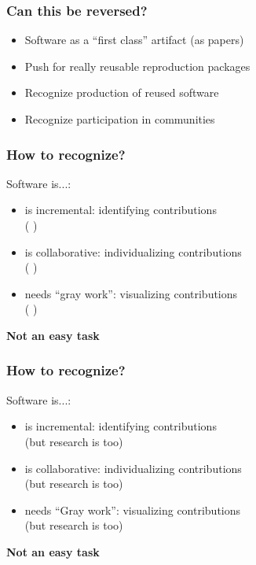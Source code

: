 \documentclass[17pt,aspectratio=169,hyperref={pdfusetitle,colorlinks,allcolors=olive}]{beamer}
\begin{document}
\begin{frame}[fragile]
  \frametitle{Can this be reversed?}
  
  \begin{itemize}
  \item Software as a ``first class'' artifact (as papers)
  \item Push for really reusable reproduction packages
  \item Recognize production of reused software
  \item Recognize participation in communities
  \end{itemize}

\end{frame}

\begin{frame}[fragile]
  \frametitle{How to recognize?}

  Software is...:
  
  \begin{itemize}
  \item is incremental: identifying contributions \\
    ( )
  \item is collaborative: individualizing contributions \\
    ( )
  \item needs ``gray work'': visualizing contributions \\
    ( )
  \end{itemize}

  \begin{center}
    \textbf{Not an easy task}
  \end{center} 
\end{frame}

\begin{frame}[fragile]
  \frametitle{How to recognize?}

  Software is...:
  
  \begin{itemize}
  \item is incremental: identifying contributions \\
    (but research is too)
  \item is collaborative: individualizing contributions \\
    (but research is too)
  \item needs ``Gray work'': visualizing contributions \\
    (but research is too)
  \end{itemize}

  \begin{center}
    \textbf{Not an easy task}
  \end{center} 
\end{frame}
\end{document}
